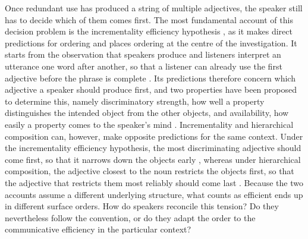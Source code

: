 \documentclass[10pt,a4paper,fleqn]{article}
\begin{document}
Once redundant use has produced a string of multiple adjectives, the speaker still has to decide which of them comes first.
The most fundamental account of this decision problem is the incrementality efficiency hypothesis \citep{rubio2020incrementality,rubio2021wordorder}, as it makes direct predictions for ordering and places ordering at the centre of the investigation.
It starts from the observation that speakers produce and listeners interpret an utterance one word after another, so that a listener can already use the first adjective before the phrase is complete \citep{tanenhaus1995integration,sedivy1999achieving}.
Its predictions therefore concern which adjective a speaker should produce first, and two properties have been proposed to determine this, namely discriminatory strength, how well a property distinguishes the intended object from the other objects, and availability, how easily a property comes to the speaker's mind \citep{fukumura2018ordering}.
Incrementality and hierarchical composition can, however, make opposite predictions for the same context.
Under the incrementality efficiency hypothesis, the most discriminating adjective should come first, so that it narrows down the objects early \citep{fukumura2018ordering,rubio2021wordorder}, whereas under hierarchical composition, the adjective closest to the noun restricts the objects first, so that the adjective that restricts them most reliably should come last \citep{scontras2019grammatical,franke2019subjectivity}.
Because the two accounts assume a different underlying structure, what counts as efficient ends up in different surface orders.
How do speakers reconcile this tension?
Do they nevertheless follow the convention, or do they adapt the order to the communicative efficiency in the particular context?
\end{document}
